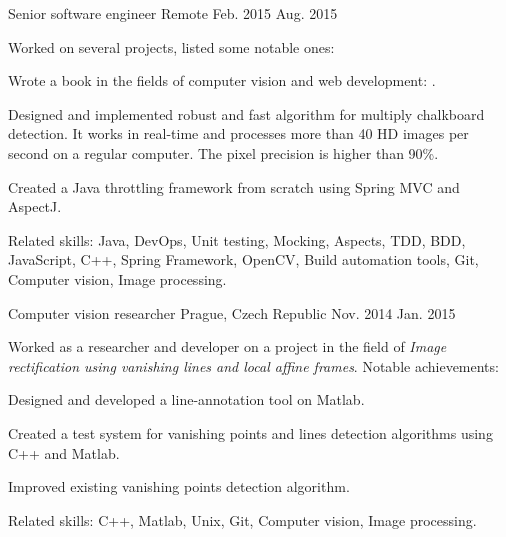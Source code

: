 \begin{cventries}
  \cventry
    {Senior software engineer} %
    {} %
    {Remote} %
    {Feb. 2015 \textemdash{} Aug. 2015} %
    {    
    Worked on several projects, listed some notable ones:
      \begin{cvitems}
      \item{Wrote a book in the fields of computer vision and web development: .}
      \item{Designed and implemented robust and fast algorithm for multiply chalkboard detection. It works in real-time and processes more than 40 HD images per second on a regular computer. The pixel precision is higher than 90\%.}
      \item{Created a Java throttling framework from scratch using Spring MVC and AspectJ.}
      \end{cvitems}
      Related skills: Java, DevOps, Unit testing, Mocking, Aspects, TDD, BDD, JavaScript, C++, Spring Framework, OpenCV, Build automation tools, Git, Computer vision, Image processing.
    }
    
  \cventry
    {Computer vision researcher} %
    {} %
    {Prague, Czech Republic} %
    {Nov. 2014 \textemdash{} Jan. 2015} %
    {
	Worked as a researcher and developer on a project in the field of \textit{Image rectification using vanishing lines and local affine frames}. Notable achievements:
      \begin{cvitems}
      \item{Designed and developed a line-annotation tool on Matlab.}
      \item{Created a test system for vanishing points and lines detection algorithms using C++ and Matlab.}
      \item{Improved existing vanishing points detection algorithm.}
      \end{cvitems}
      Related skills: C++, Matlab, Unix, Git, Computer vision, Image processing.
    }
    

\end{cventries}
